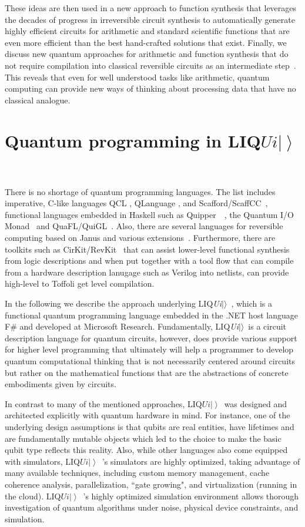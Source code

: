 \documentclass[conference]{IEEEtran}
\newcommand{\ket}[1]{\left| #1\right\rangle}        %
\newcommand{\Liquid}{LIQ$Ui\ket{}$\ }
\newcommand{\LIQUID}{{LIQ{\em Ui}$|\rangle$}}
\begin{document}
These ideas are then used in a new approach to function synthesis that leverages the decades of progress in irreversible circuit synthesis to automatically generate highly efficient circuits for arithmetic and standard scientific functions that are even more efficient than the best hand-crafted solutions that exist.  Finally, we discuss new quantum approaches for arithmetic and function synthesis that do not require compilation into classical reversible circuits as an intermediate step~\cite{WR16}.  This reveals that even for well understood tasks like arithmetic, quantum computing can provide new ways of thinking about processing data that have no classical analogue. 

\section{Quantum programming in \Liquid} %

There is no shortage of quantum programming languages. The list includes imperative, C-like languages QCL \cite{Oemer:2005}, QLanguage \cite{BCS:2003}, and Scafford/ScaffCC~\cite{HPJ+:2015,KPK+:2015}, functional languages embedded in Haskell such as Quipper~~\cite{GLR+:2013a,GLR+:2013b}, the Quantum I/O Monad~\cite{AG:2009} and QuaFL/QuiGL~\cite{LST+:2013,LR:2013}. Also, there are several languages for reversible computing based on Janus and various extensions~\cite{YG:2007,Thomsen:2012,Perumalla:2014}. 
Furthermore, there are toolkits such as CirKit/RevKit~\cite{SFWD12} that can assist lower-level functional synthesis from logic descriptions and when put together with a tool flow that can compile from a hardware description lanugage such as Verilog into netlists, can provide high-level to Toffoli get level compilation. 

In the following we describe the approach underlying \LIQUID~\cite{WS:2014}, which is a functional quantum programming language embedded in the .NET host language F\# and developed at Microsoft Research. Fundamentally, \LIQUID~is a circuit description language for quantum circuits, however, does provide various support for higher level programming that ultimately will help a programmer to develop quantum computational thinking that is not necessarily centered around circuits but rather on the mathematical functions that are the abstractions of concrete embodiments given by circuits. 

In contrast to many of the mentioned approaches, \Liquid was designed and architected explicitly with quantum hardware in mind. 
For instance, one of the underlying design assumptions is that qubits are real entities, have lifetimes and are fundamentally mutable objects which led to the choice to make the basic qubit type reflects this reality.
Also, while other languages also come equipped with simulators, \Liquid's simulators are highly optimized, taking advantage of many available techniques, including custom memory management, cache coherence analysis, parallelization, ``gate growing", and virtualization (running in the cloud). \Liquid's highly optimized simulation environment allows thorough investigation of quantum algorithms under noise, physical device constraints, and simulation.
\end{document}
